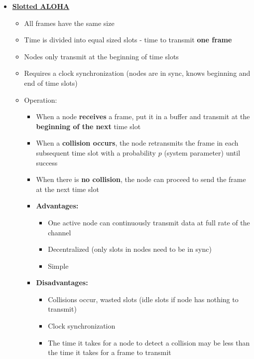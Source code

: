 \documentclass{article}
\begin{document}
\begin{itemize}
        \item \textbf{\underline{Slotted ALOHA}}
        \begin{itemize}
            \item All frames have the same size
            \item Time is divided into equal sized slots - time to transmit \textbf{one frame}
            \item Nodes only transmit at the beginning of time slots
            \item Requires a clock synchronization (nodes are in sync, knows beginning and end of 
            time slots)
            \item Operation:
            \begin{itemize}
                \item When a node \textbf{receives} a frame, put it in a buffer and transmit
                at the \textbf{beginning of the next} time slot
                \item When a \textbf{collision occurs}, the node retransmits the frame in each
                subsequent time slot with a probability $p$ (system parameter) until success
                \item When there is \textbf{no collision}, the node can proceed to send the frame
                at the next time slot
                \item \textbf{Advantages:}
                \begin{itemize}
                    \item One active node can continuously transmit data at full rate of the channel
                    \item Decentralized (only slots in nodes need to be in sync)
                    \item Simple
                \end{itemize}
                \item \textbf{Disadvantages:}
                    \begin{itemize}
                        \item Collisions occur, wasted slots (idle slots if node has nothing to transmit)
                        \item Clock synchronization
                        \item The time it takes for a node to detect a collision may be less than the time
                        it takes for a frame to transmit
                    \end{itemize}

\end{itemize}
\end{itemize}
\end{itemize}
\end{document}
